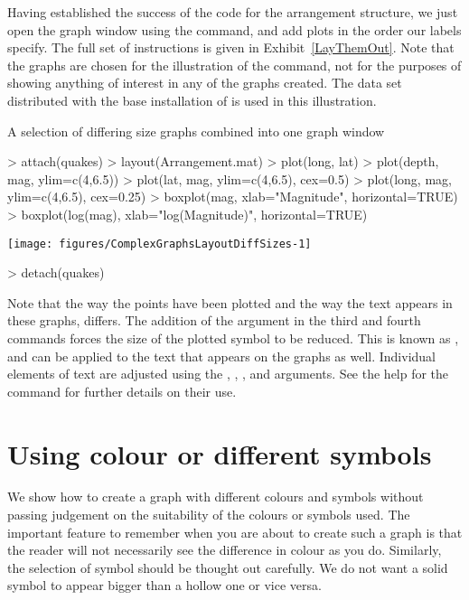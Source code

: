 Having established the success of the code for the arrangement structure, we just open the graph window using the  command, and add plots in the order our labels specify. The full set of instructions is given in Exhibit~\ref{LayThemOut}. Note that the graphs are chosen for the illustration of the  command, not for the purposes of showing anything of interest in any of the graphs created. The  data set distributed with the base installation of \R{} is used in this illustration.
\begin{exhibit}
\begin{center}
\caption{A selection of differing size graphs combined into one graph window}
\label{LayThemOut}
\begin{Schunk}
\begin{Sinput}
> attach(quakes)
> layout(Arrangement.mat)
> plot(long, lat)
> plot(depth, mag, ylim=c(4,6.5))
> plot(lat, mag, ylim=c(4,6.5), cex=0.5)
> plot(long, mag, ylim=c(4,6.5), cex=0.25)
> boxplot(mag, xlab="Magnitude", horizontal=TRUE)
> boxplot(log(mag), xlab="log(Magnitude)", horizontal=TRUE)
\end{Sinput}

\texttt{[image: figures/ComplexGraphsLayoutDiffSizes-1]} \begin{Sinput}
> detach(quakes)
\end{Sinput}
\end{Schunk}
\end{center}
\end{exhibit}

Note that the way the points have been plotted and the way the text appears in these graphs, differs. The addition of the  argument in the third and fourth  commands forces the size of the plotted symbol to be reduced. This is known as , and can be applied to the text that appears on the graphs as well. Individual elements of text are adjusted using the , , , and  arguments. See the help for the  command for further details on their use.

\section{Using colour or different symbols}

We show how to create a graph with different colours and symbols without passing judgement on the suitability of the colours or symbols used. The important feature to remember when you are about to create such a graph is that the reader will not necessarily see the difference in colour as you do. Similarly, the selection of symbol should be thought out carefully. We do not want a solid symbol to appear bigger than a hollow one or vice versa.

